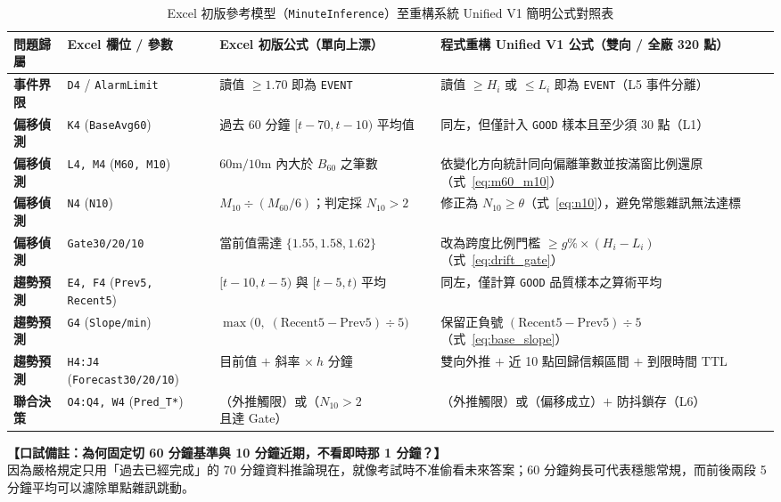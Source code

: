 \documentclass[fontset=none, a4paper, 12pt]{ctexart}
\begin{document}
\begin{doublespace}
\begin{table}[H]
\centering
\caption{Excel 初版參考模型（\texttt{MinuteInference}）至重構系統 Unified V1 簡明公式對照表}
\label{tab:excel_to_program_map}
\scriptsize
\renewcommand{\arraystretch}{1.2}
\setlength{\tabcolsep}{3.5pt}
\begin{tabularx}{\textwidth}{>{\bfseries}l l X X}
\toprule
問題歸屬 & Excel 欄位 / 參數 & Excel 初版公式（單向上漂） & 程式重構 Unified V1 公式（雙向 / 全廠 320 點） \\
\midrule
事件界限 & \texttt{D4} / \texttt{AlarmLimit} & 讀值 $\ge 1.70$ 即為 \texttt{EVENT} & 讀值 $\ge H_i$ 或 $\le L_i$ 即為 \texttt{EVENT}（L5 事件分離） \\
偏移偵測 & \texttt{K4} (\texttt{BaseAvg60}) & 過去 60 分鐘 $[t-70,t-10)$ 平均值 & 同左，但僅計入 \texttt{GOOD} 樣本且至少須 30 點（L1） \\
偏移偵測 & \texttt{L4, M4} (\texttt{M60, M10}) & $60\mathrm{m}/10\mathrm{m}$ 內大於 $B_{60}$ 之筆數 & 依變化方向統計同向偏離筆數並按滿窗比例還原（式~\eqref{eq:m60_m10}） \\
偏移偵測 & \texttt{N4} (\texttt{N10}) & $M_{10} \div (M_{60}/6)$；判定採 $N_{10} > 2$ & 修正為 $N_{10} \ge \theta$（式~\eqref{eq:n10}），避免常態雜訊無法達標 \\
偏移偵測 & \texttt{Gate30/20/10} & 當前值需達 $\{1.55,1.58,1.62\}$ & 改為跨度比例門檻 $\ge g\%\times(H_i-L_i)$（式~\eqref{eq:drift_gate}） \\
趨勢預測 & \texttt{E4, F4} (\texttt{Prev5, Recent5}) & $[t-10,t-5)$ 與 $[t-5,t)$ 平均 & 同左，僅計算 \texttt{GOOD} 品質樣本之算術平均 \\
趨勢預測 & \texttt{G4} (\texttt{Slope/min}) & $\max\bigl(0,\; (\mathrm{Recent5}-\mathrm{Prev5})\div 5\bigr)$ & 保留正負號 $(\mathrm{Recent5}-\mathrm{Prev5})\div 5$（式~\eqref{eq:base_slope}） \\
趨勢預測 & \texttt{H4:J4} (\texttt{Forecast30/20/10}) & 目前值 $+$ 斜率 $\times\ h$ 分鐘 & 雙向外推 $+$ 近 10 點回歸信賴區間 $+$ 到限時間 $\mathrm{TTL}$ \\
聯合決策 & \texttt{O4:Q4, W4} (\texttt{Pred\_T*}) & （外推觸限）或（$N_{10}>2$ 且達 Gate） & （外推觸限）或（偏移成立）$+$ 防抖鎖存（L6） \\
\bottomrule
\end{tabularx}
\end{table}

\noindent\textbf{【口試備註：為何固定切 60 分鐘基準與 10 分鐘近期，不看即時那 1 分鐘？】}\\
因為嚴格規定只用「過去已經完成」的 70 分鐘資料推論現在，就像考試時不准偷看未來答案；60 分鐘夠長可代表穩態常規，而前後兩段 5 分鐘平均可以濾除單點雜訊跳動。


\end{doublespace}
\end{document}
